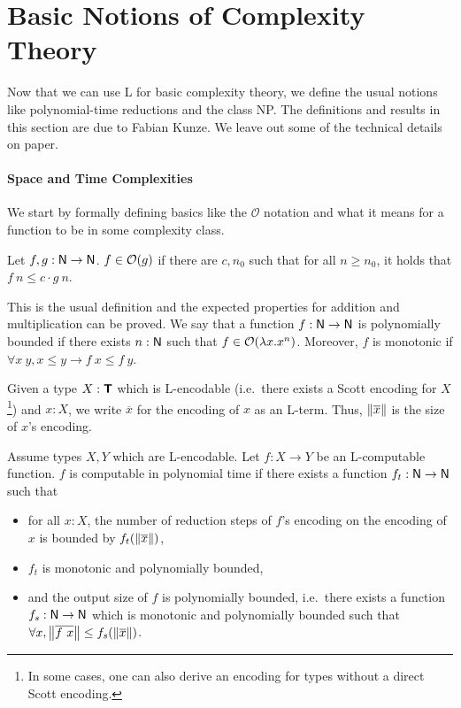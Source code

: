 \section{Basic Notions of Complexity Theory}\label{sec:np_basics}
Now that we can use L for basic complexity theory, we define the usual notions like polynomial-time reductions and the class \textsf{NP}. The definitions and results in this section are due to Fabian Kunze. We leave out some of the technical details on paper.

\paragraph{Space and Time Complexities}
We start by formally defining basics like the $\mathcal{O}$ notation and what it means for a function to be in some complexity class.

\begin{definition}[$\mathcal{O}$]
  Let $f, g : \mathsf{N} \rightarrow \mathsf{N}$. $f \in \mathcal{O}{(g)}$ if there are $c, n_0$ such that for all $n \ge n_0$, it holds that $f~n \le c \cdot g~n$.
\end{definition}
This is the usual definition and the expected properties for addition and multiplication can be proved. 
We say that a function $f : \mathsf{N} \rightarrow \mathsf{N}$ is polynomially bounded if there exists $n : \mathsf{N}$ such that $f \in \mathcal{O}{(\lambda x. x^n)}$. Moreover, $f$ is monotonic if $\forall x~y, x \le y \rightarrow f~x \le f~y$.

Given a type $X : \textsf{\bfseries T}$ which is L-encodable (i.e.\ there exists a Scott encoding for $X$\footnote{In some cases, one can also derive an encoding for types without a direct Scott encoding.}) and $x : X$, we write $\overline{x}$ for the encoding of $x$ as an L-term. Thus, $\left\lVert\overline{x}\right\rVert$ is the size of $x$'s encoding. 

\begin{definition}
  Assume types $X, Y$ which are L-encodable.
  Let $f : X \rightarrow Y$ be an L-computable function.  
  $f$ is computable in polynomial time if there exists a function $f_t : \mathsf{N} \rightarrow \mathsf{N}$ such that
  \begin{itemize}
    \item for all $x : X$, the number of reduction steps of $f$'s encoding on the encoding of $x$ is bounded by $f_t(\left\lVert\overline{x}\right\rVert)$, 
    \item $f_t$ is monotonic and polynomially bounded, 
    \item and the output size of $f$ is polynomially bounded, i.e.\ there exists a function $f_s : \mathsf{N} \rightarrow \mathsf{N}$ which is monotonic and polynomially bounded such that $\forall x, \left\lVert\overline{f~x}\right\rVert \le f_s (\left\lVert\overline{x}\right\rVert)$. 
  \end{itemize}
\end{definition}

